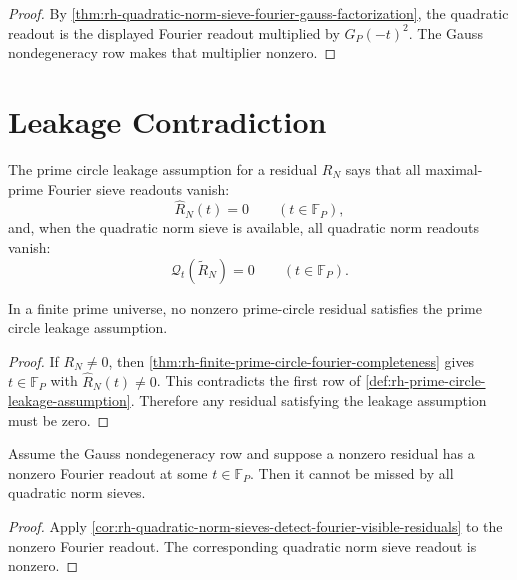 \begin{proof}
By
\autoref{thm:rh-quadratic-norm-sieve-fourier-gauss-factorization}, the
quadratic readout is the displayed Fourier readout multiplied by
$G_P(-t)^2$.  The Gauss nondegeneracy row makes that multiplier nonzero.
\end{proof}

\section{Leakage Contradiction}
\label{sec:rh-finite-prime-circle-universe-leakage}

\begin{definition}
\label{def:rh-prime-circle-leakage-assumption}
The prime circle leakage assumption for a residual $R_N$ says that all
maximal-prime Fourier sieve readouts vanish:
$$
\widehat R_N(t)=0
\qquad
(t\in\mathbb F_P),
$$
and, when the quadratic norm sieve is available, all quadratic norm
readouts vanish:
$$
\mathcal Q_t(\widetilde R_N)=0
\qquad
(t\in\mathbb F_P).
$$
\end{definition}

\begin{theorem}
\label{thm:rh-finite-prime-universe-leakage-contradiction}
In a finite prime universe, no nonzero prime-circle residual satisfies
the prime circle leakage assumption.
\end{theorem}

\begin{proof}
If $R_N\ne0$, then
\autoref{thm:rh-finite-prime-circle-fourier-completeness} gives
$t\in\mathbb F_P$ with $\widehat R_N(t)\ne0$.  This contradicts the
first row of
\autoref{def:rh-prime-circle-leakage-assumption}.  Therefore any
residual satisfying the leakage assumption must be zero.
\end{proof}

\begin{corollary}
\label{cor:rh-quadratic-leakage-contradiction}
Assume the Gauss nondegeneracy row and suppose a nonzero residual has a
nonzero Fourier readout at some $t\in\mathbb F_P$.  Then it cannot be missed by
all quadratic norm sieves.
\end{corollary}

\begin{proof}
Apply
\autoref{cor:rh-quadratic-norm-sieves-detect-fourier-visible-residuals}
to the nonzero Fourier readout.  The corresponding quadratic norm
sieve readout is nonzero.
\end{proof}


